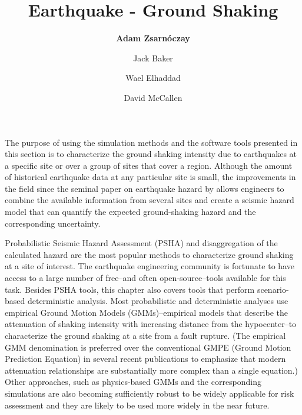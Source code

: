 %
%
%

\title{Earthquake - Ground Shaking}
\label{chp:eq_shaking}
\author{
    \textbf{Adam Zsarnóczay}
    \and Jack Baker 
    \and Wael Elhaddad
    \and David McCallen}
\tocauthor{}
%
%
\maketitle

The purpose of using the simulation methods and the software tools presented in this section is to characterize the ground shaking intensity due to earthquakes at a specific site or over a group of sites that cover a region. Although the amount of historical earthquake data at any particular site is small, the improvements in the field since the seminal paper on earthquake hazard by \cite{cornell1968engineering} allows engineers to combine the available information from several sites and create a seismic hazard model that can quantify the expected ground-shaking hazard and the corresponding uncertainty. 

Probabilistic Seismic Hazard Assessment (PSHA) and disaggregation of the calculated hazard \citep{bazzurro1999disaggregation} are the most popular methods to characterize ground shaking at a site of interest. The earthquake engineering community is fortunate to have access to a large number of free--and often open-source--tools available for this task. Besides PSHA tools, this chapter also covers tools that perform scenario-based deterministic analysis. Most probabilistic and deterministic analyses use empirical Ground Motion Models (GMMs)--empirical models that describe the attenuation of shaking intensity with increasing distance from the hypocenter--to characterize the ground shaking at a site from a fault rupture. (The empirical GMM denomination is preferred over the conventional GMPE (Ground Motion Prediction Equation) in several recent publications to emphasize that modern attenuation relationships are substantially more complex than a single equation.) Other approaches, such as physics-based GMMs and the corresponding simulations are also becoming sufficiently robust to be widely applicable for risk assessment and they are likely to be used more widely in the near future. 

